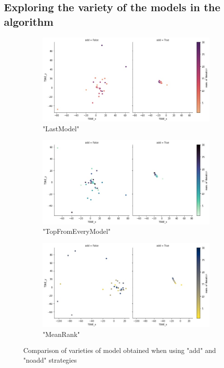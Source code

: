 \subsection{Exploring the variety of the models in the algorithm}
\begin{figure}
\centering
\begin{subfigure}{\textwidth}
\centering
\includegraphics[scale = 0.50]{Images/LMtsne.jpg}
\caption{"LastModel"}
\end{subfigure}
\hfill\break
\begin{subfigure}{\textwidth}
\centering
\includegraphics[scale = 0.50]{Images/TPEVtsne.jpg}
\caption{"TopFromEveryModel"}
\end{subfigure}
\hfill\break
\begin{subfigure}{\textwidth}
\centering
\includegraphics[scale = 0.50]{Images/MRtsne.jpg}
\caption{"MeanRank"}
\end{subfigure}
\caption{Comparison of varieties of model obtained when using "add" and "noadd" strategies}
\label{tsne}
\end{figure}

